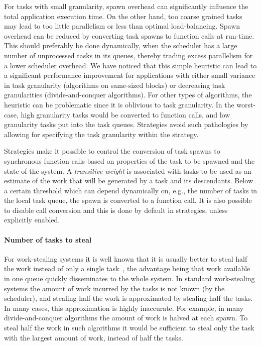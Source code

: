 \documentclass[a4paper,11pt]{article}
\begin{document}
For tasks with small granularity, spawn overhead can significantly
influence the total application execution time. On the other hand, too
coarse grained tasks may lead to too little parallelism or less than
optimal load-balancing.  Spawn overhead can be reduced by converting
task spawns to function calls at run-time. This should preferably be
done dynamically, when the scheduler has a large number of unprocessed
tasks in its queues, thereby trading excess parallelism for a
lower scheduler overhead.  We have noticed that this simple heuristic
can lead to a significant performance improvement for applications
with either small variance in task granularity (algorithms on
same-sized blocks) or decreasing task granularities
(divide-and-conquer algorithms).
For other types of algorithms, the heuristic can be problematic since
it is oblivious to task granularity. In the worst-case, high
granularity tasks would be converted to function calls, and low
granularity tasks put into the task queues.  Strategies avoid such
pathologies by allowing for specifying the task granularity within the
strategy.

Strategies make it possible to control the conversion of task spawns
to synchronous function calls based on properties of the task to be
spawned and the state of the system. A \emph{transitive weight} is
associated with tasks to be used as an estimate of the work that will
be generated by a task and its descendants. Below a certain threshold
which can depend dynamically on, e.g., the number of tasks in the
local task queue, the spawn is converted to a function call.  It is
also possible to disable call conversion and this is done by default
in strategies, unless explicitly enabled.

\paragraph{Number of tasks to steal}

For work-stealing systems it is well known that it is usually better
to steal half the work instead of only a single
task~\cite{Berenbrink01}, the advantage being that work available in
one queue quickly disseminates to the whole system.  In standard
work-stealing systems the amount of work incurred by the tasks is not
known (by the scheduler), and stealing half the work is approximated
by stealing half the tasks. In many cases, this approximation is
highly inaccurate.  For example, in many divide-and-conquer algorithms
the amount of work is halved at each spawn.  To steal half the work in
such algorithms it would be sufficient to steal only the task with the
largest amount of work, instead of half the tasks.
\end{document}
